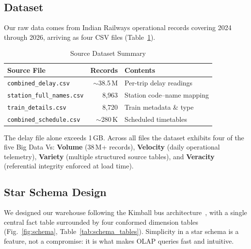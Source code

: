 \documentclass[conference]{IEEEtran}
\begin{document}
\subsection{Dataset}

Our raw data comes from Indian Railways operational records covering 2024
through 2026, arriving as four CSV files (Table~\ref{tab:dataset}).

\begin{table}[htbp]
  \caption{Source Dataset Summary}
  \label{tab:dataset}
  \begin{center}
    \begin{tabular}{|l|r|l|}
      \hline
      \textbf{Source File} & \textbf{Records} & \textbf{Contents} \\
      \hline
      \texttt{combined\_delay.csv}      & $\sim$38.5\,M & Per-trip delay readings \\
      \texttt{station\_full\_names.csv} & 8,963  & Station code--name mapping \\
      \texttt{train\_details.csv}       & 8,720  & Train metadata \& type \\
      \texttt{combined\_schedule.csv}   & $\sim$280\,K & Scheduled timetables \\
      \hline
    \end{tabular}
  \end{center}
\end{table}

The delay file alone exceeds 1\,GB.
Across all files the dataset exhibits four of the five Big Data Vs:
\textbf{Volume} (38\,M+ records), \textbf{Velocity} (daily operational
telemetry), \textbf{Variety} (multiple structured source tables), and
\textbf{Veracity} (referential integrity enforced at load time).

\subsection{Star Schema Design}

We designed our warehouse following the Kimball bus architecture~\cite{b3},
with a single central fact table surrounded by four conformed dimension
tables (Fig.~\ref{fig:schema}, Table~\ref{tab:schema_tables}).
Simplicity in a star schema is a feature, not a compromise: it is what
makes OLAP queries fast and intuitive.
\end{document}
